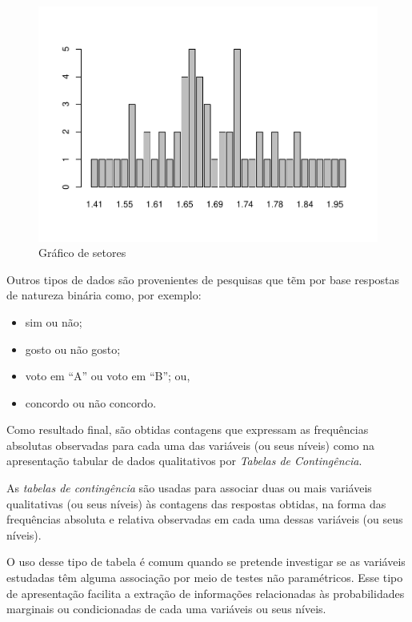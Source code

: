\documentclass[
]{book}
\providecommand{\tightlist}{%
  \setlength{\itemsep}{0pt}\setlength{\parskip}{0pt}}
\begin{document}
\begin{figure}
\centering
\includegraphics{apostila_files/figure-latex/unnamed-chunk-44-1.pdf}
\caption{\label{fig:unnamed-chunk-44}Gráfico de setores}
\end{figure}

\hfill\break

Outros tipos de dados são provenientes de pesquisas que tẽm por base respostas de natureza binária como, por exemplo:

\hfill\break

\begin{itemize}
\tightlist
\item
  sim ou não;
\item
  gosto ou não gosto;
\item
  voto em ``A'' ou voto em ``B''; ou,
\item
  concordo ou não concordo.
\end{itemize}

\hfill\break

Como resultado final, são obtidas contagens que expressam as frequências absolutas observadas para cada uma das variáveis (ou seus níveis) como na apresentação tabular de dados qualitativos por \emph{Tabelas de Contingência}.

\hfill\break

As \emph{tabelas de contingência} são usadas para associar duas ou mais variáveis qualitativas (ou seus níveis) às contagens das respostas obtidas, na forma das frequências absoluta e relativa observadas em cada uma dessas variáveis (ou seus níveis).

\hfill\break

O uso desse tipo de tabela é comum quando se pretende investigar se as variáveis estudadas têm alguma associação por meio de testes não paramétricos. Esse tipo de apresentação facilita a extração de informações relacionadas às probabilidades marginais ou condicionadas de cada uma variáveis ou seus níveis.
\end{document}
